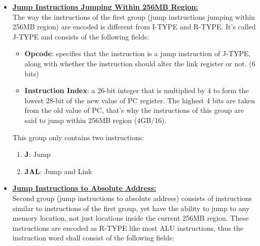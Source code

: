 \documentclass[]{scrartcl}
\begin{document}
\begin{itemize}

\item \textbf{\underline{Jump Instructions Jumping Within 256MB Region:}} \\

The way the instructions of the first group (jump instructions jumping
within 256MB region) are encoded is different from I-TYPE and R-TYPE. It's
called J-TYPE and consists of the following fields:

\begin{itemize}

\item \textbf{Opcode}: specifies that the instruction is a jump instruction
                       of J-TYPE, along with whether the instruction
                       should alter the link register or not. (6 bits)

\item \textbf{Instruction Index}: a 26-bit integer that is multiplied by 4
                                  to form the lowest 28-bit of the new value
                                  of PC register. The highest 4 bits are taken
                                  from the old value of PC, that's why the
                                  instructions of this group are said to
                                  jump within 256MB region (4GB/16).

\end{itemize}

This group only contains two instructions:

\begin{enumerate}

\item \textbf{J}:   Jump
\item \textbf{JAL}: Jump and Link

\end{enumerate}

\item \textbf{\underline{Jump Instructions to Absolute Address:}} \\

Second group (jump instructions to absolute address) consists of instructions
similar to instructions of the first group, yet have the ability to jump
to any memory location, not just locations inside the current 256MB region.
These instructions are encoded as R-TYPE like most ALU instructions, thus
the instruction word shall consist of the following fields:


\end{itemize}
\end{document}

